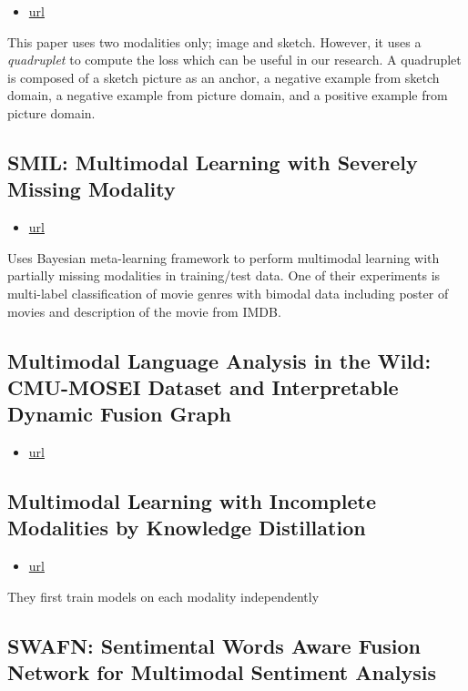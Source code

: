 \documentclass[11pt]{article}
\begin{document}
\begin{itemize}
\item \href{https://arxiv.org/pdf/2102.04016.pdf}{url}
\end{itemize}
This paper uses two modalities only; image and sketch. However, it uses a \textit{quadruplet} to compute the loss which can be useful in our research. A quadruplet is composed of a sketch picture as an anchor, a negative example from sketch domain, a negative example from picture domain, and a positive example from picture domain.

\subsection{SMIL: Multimodal Learning with Severely Missing Modality}

\begin{itemize}
\item \href{https://www.aaai.org/AAAI21Papers/AAAI-437.MaM.pdf}{url}
\end{itemize}
Uses Bayesian meta-learning framework to perform multimodal learning with partially missing modalities in training/test data.
One of their experiments is multi-label classification of movie genres with bimodal data including poster of movies and description of the movie from IMDB.

\subsection{Multimodal Language Analysis in the Wild: CMU-MOSEI Dataset and Interpretable Dynamic Fusion Graph}

\begin{itemize}
\item \href{https://aclanthology.org/P18-1208.pdf}{url}
\end{itemize}

\subsection{Multimodal Learning with Incomplete Modalities by Knowledge Distillation}

\begin{itemize}
\item \href{https://dl.acm.org/doi/pdf/10.1145/3394486.3403234}{url}
\end{itemize}
They first train models on each modality independently
\subsection{SWAFN: Sentimental Words Aware Fusion Network for Multimodal Sentiment Analysis}
\end{document}
